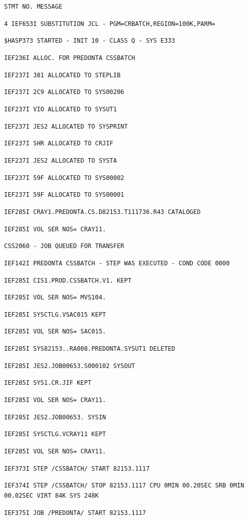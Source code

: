 \texttt{STMT NO. MESSAGE}

\texttt{4 IEF653I SUBSTITUTION JCL - PGM=CRBATCH,REGION=100K,PARM=}

\texttt{\$HASP373 STARTED - INIT 10 - CLASS Q - SYS E333}

\texttt{IEF236I ALLOC. FOR PREDONTA CSSBATCH}

\texttt{IEF237I 381 ALLOCATED TO STEPLIB}

\texttt{IEF237I 2C9 ALLOCATED TO SYS00206}

\texttt{IEF237I VIO ALLOCATED TO SYSUT1}

\texttt{IEF237I JES2 ALLOCATED TO SYSPRINT}

\texttt{IEF237I SHR ALLOCATED TO CRJIF}

\texttt{IEF237I JES2 ALLOCATED TO SYSTA}

\texttt{IEF237I 59F ALLOCATED TO SYS00002}

\texttt{IEF237I 59F ALLOCATED TO SYS00001}

\texttt{IEF285I CRAY1.PREDONTA.CS.D82153.T111736.R43 CATALOGED}

\texttt{IEF285I VOL SER NOS= CRAY11.}

\texttt{CSS2060 - JOB QUEUED FOR TRANSFER}

\texttt{IEF142I PREDONTA CSSBATCH - STEP WAS EXECUTED - COND CODE 0000}

\texttt{IEF285I CIS1.PROD.CSSBATCH.V1. KEPT}

\texttt{IEF285I VOL SER NOS= MVS104.}

\texttt{IEF285I SYSCTLG.VSAC015 KEPT}

\texttt{IEF285I VOL SER NOS= SAC015.}

\texttt{IEF285I SYS82153..RA008.PREDONTA.SYSUT1 DELETED}

\texttt{IEF285I JES2.JOB00653.S000102 SYSOUT}

\texttt{IEF285I SYS1.CR.JIF KEPT}

\texttt{IEF285I VOL SER NOS= CRAY11.}

\texttt{IEF285I JES2.JOB00653. SYSIN}

\texttt{IEF285I SYSCTLG.VCRAY11 KEPT}

\texttt{IEF285I VOL SER NOS= CRAY11.}

\texttt{IEF373I STEP /CSSBATCH/ START 82153.1117}

\texttt{IEF374I STEP /CSSBATCH/ STOP 82153.1117 CPU 0MIN 00.20SEC SRB 0MIN 00.02SEC VIRT 84K SYS 248K}

\texttt{IEF375I JOB /PREDONTA/ START 82153.1117}

